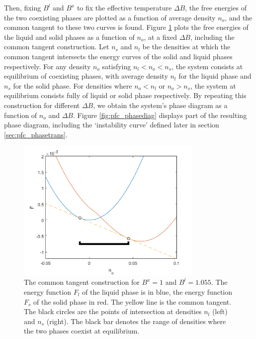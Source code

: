 Then, fixing $B^l$ and $B^x$ to fix the effective temperature $\Delta B$, the free energies of the two coexisting phases are plotted as a function of average density $n_o$, and the common tangent to these two curves is found. Figure \ref{fig:commonTangent} plots the free energies of the liquid and solid phases as a function of $n_o$, at a fixed $\Delta B$, including the common tangent construction. Let $n_s$ and $n_l$ be the densities at which the common tangent intersects the energy curves of the solid and liquid phases respectively. For any density $n_o$ satisfying $n_l<n_o<n_s$, the system consists at equilibrium of coexisting phases, with average density $n_l$ for the liquid phase and $n_s$ for the solid phase. For densities where $n_o<n_l$ or $n_o>n_s$, the system at equilibrium consists fully of liquid or solid phase respectively. By repeating this construction for different $\Delta B$, we obtain the system's phase diagram as a function of $n_o$ and $\Delta B$. Figure \ref{fig:pfc_phasediag} displays part of the resulting phase diagram, including the `instability curve' defined later in section \ref{sec:pfc_phasetrans}.

\begin{figure}[h]
\centering
\includegraphics[width=0.8\textwidth]{fig_pfc/commonTangentMod.png}
\caption{The common tangent construction for $B^x=1$ and $B^l=1.055$. The energy function $F_l$ of the liquid phase is in blue, the energy function $F_s$ of the solid phase in red. The yellow line is the common tangent. The black circles are the points of intersection at densities $n_l$ (left) and $n_s$ (right). The black bar denotes the range of densities where the two phases coexist at equilibrium.  }\label{fig:commonTangent}
\end{figure}

